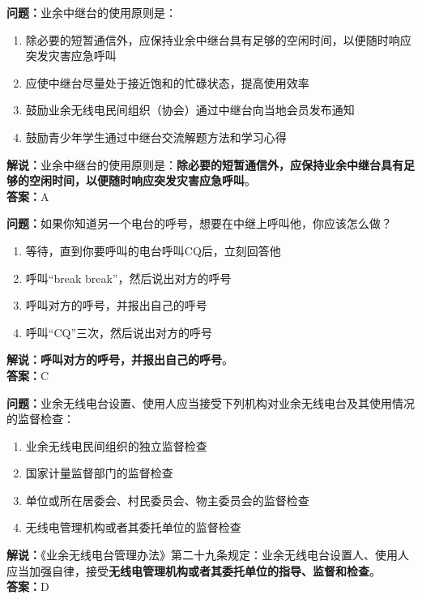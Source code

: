\documentclass{ctexbook}
\begin{document}


\bigskip


\noindent\textbf{问题：}业余中继台的使用原则是：
\begin{enumerate}[label=\Alph*), leftmargin=3em]
	\item 除必要的短暂通信外，应保持业余中继台具有足够的空闲时间，以便随时响应突发灾害应急呼叫
	\item 应使中继台尽量处于接近饱和的忙碌状态，提高使用效率
	\item 鼓励业余无线电民间组织（协会）通过中继台向当地会员发布通知
	\item 鼓励青少年学生通过中继台交流解题方法和学习心得
\end{enumerate}
\noindent\textbf{解说：}业余中继台的使用原则是：\textbf{除必要的短暂通信外，应保持业余中继台具有足够的空闲时间，以便随时响应突发灾害应急呼叫}。\\\noindent\textbf{答案：}A



\bigskip


\noindent\textbf{问题：}如果你知道另一个电台的呼号，想要在中继上呼叫他，你应该怎么做？
\begin{enumerate}[label=\Alph*), leftmargin=3em]
	\item 等待，直到你要呼叫的电台呼叫CQ后，立刻回答他
	\item 呼叫“break break”，然后说出对方的呼号
	\item 呼叫对方的呼号，并报出自己的呼号
	\item 呼叫“CQ”三次，然后说出对方的呼号
\end{enumerate}
\noindent\textbf{解说：}\textbf{呼叫对方的呼号，并报出自己的呼号}。\\\noindent\textbf{答案：}C



\bigskip


\noindent\textbf{问题：}业余无线电台设置、使用人应当接受下列机构对业余无线电台及其使用情况的监督检查：
\begin{enumerate}[label=\Alph*), leftmargin=3em]
	\item 业余无线电民间组织的独立监督检查
	\item 国家计量监督部门的监督检查
	\item 单位或所在居委会、村民委员会、物主委员会的监督检查
	\item 无线电管理机构或者其委托单位的监督检查
\end{enumerate}
\noindent\textbf{解说：}《业余无线电台管理办法》第二十九条规定：业余无线电台设置人、使用人应当加强自律，接受\textbf{无线电管理机构或者其委托单位的指导、监督和检查}。\\\noindent\textbf{答案：}D
\end{document}
